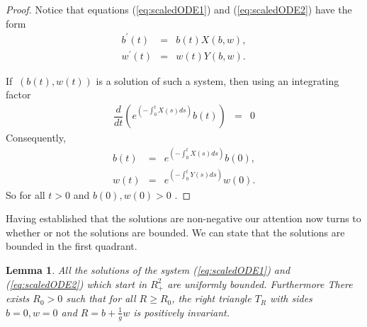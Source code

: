 \documentclass[review,authoryear]{elsarticle}
\newtheorem{lemma}[theorem]{Lemma}
\begin{document}
\begin{proof}
  Notice that equations (\ref{eq:scaledODE1}) and
  (\ref{eq:scaledODE2}) have the form
\begin{eqnarray}
  b^{\prime}\left( t \right) & = & b(t)X\left( b,w\right), \\
  w^{\prime}\left( t \right) & = & w(t)Y\left( b,w\right).
\end{eqnarray}


If $\ \left( b\left( t\right) ,w\left( t\right) \right)
$ is a solution of such a system, then using an integrating factor
\begin{eqnarray}
\dfrac{d}{dt}\left( e^{\left( -\int_{0}^{t}X(s)ds\right) }b(t)\right) & = & 0
\end{eqnarray}
Consequently,
\begin{eqnarray}
b(t) & = & e^{\left( -\int_{0}^{t}X(s)ds\right) }b(0), \\
w(t) & = & e^{\left( -\int_{0}^{t}Y(s)ds\right) }w(0).
\end{eqnarray}
So for all $t>0$ and $b\left( 0\right) ,w\left( 0\right) >0$ .
\end{proof}

Having established that the solutions are non-negative our attention
now turns to whether or not the solutions are bounded. We can state
that the solutions are bounded in the first quadrant.
\begin{lemma} \label{mm}
All the solutions of the system (\ref{eq:scaledODE1}) and (\ref{eq:scaledODE2}) which start in $R_{+}^{2}$ are
uniformly bounded. Furthermore There exists $R_{0}>0$  such that for all $R\geq R_{0}$, the right
triangle $T_{R}$ with sides $b=0, w=0$ and $R=b+\frac{1}{g}w $ is positively invariant.
\end{lemma}
\end{document}
